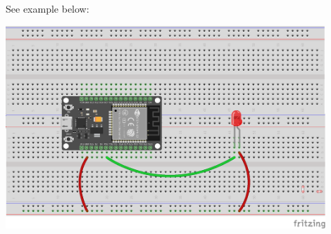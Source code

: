 \documentclass[12pt, a4paper]{article}
\begin{document}
See example below:
\begin{center}
  \includegraphics[width=12cm, keepaspectratio]{fritzing/pwm_led.png}
\end{center}



\end{document}
